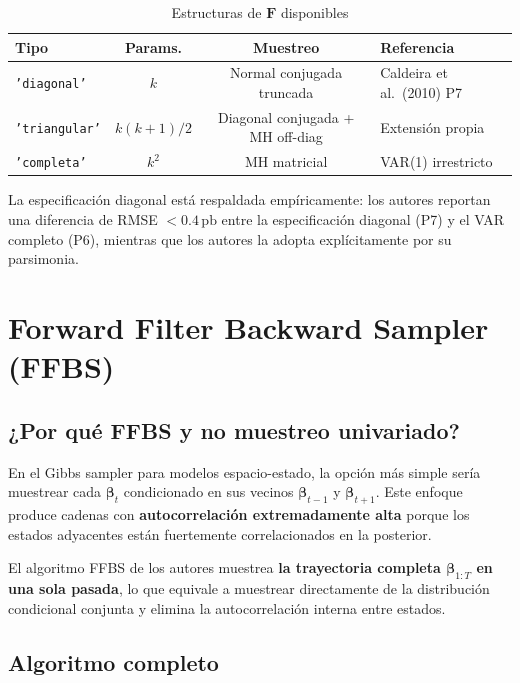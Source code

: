 \documentclass[12pt, a4paper]{article}
\theoremstyle{plain}
\theoremstyle{definition}
\theoremstyle{remark}
\newcommand{\bbet}{\bm{\beta}}
\newcommand{\bF}{\mathbf{F}}
\begin{document}
\begin{table}[H]
\centering
\caption{Estructuras de $\bF$ disponibles}
\small
\begin{tabular}{lccl}
\toprule
\textbf{Tipo} & \textbf{Params.} & \textbf{Muestreo} & \textbf{Referencia} \\
\midrule
\texttt{'diagonal'} & $k$ & Normal conjugada truncada & Caldeira et al.\ (2010) P7 \\
\texttt{'triangular'} & $k(k+1)/2$ & Diagonal conjugada + MH off-diag & Extensión propia \\
\texttt{'completa'} & $k^2$ & MH matricial & VAR(1) irrestricto \\
\bottomrule
\end{tabular}
\end{table}

La especificación diagonal está respaldada empíricamente: los autores
reportan una diferencia de RMSE $< 0.4\,\text{pb}$ entre la especificación
diagonal (P7) y el VAR completo (P6), mientras que los autores
la adopta explícitamente por su parsimonia.

\section{Forward Filter Backward Sampler (FFBS)}

\subsection{¿Por qué FFBS y no muestreo univariado?}

En el Gibbs sampler para modelos espacio-estado, la opción más simple
sería muestrear cada $\bbet_t$ condicionado en sus vecinos $\bbet_{t-1}$
y $\bbet_{t+1}$. Este enfoque produce cadenas con \textbf{autocorrelación
extremadamente alta} porque los estados adyacentes están fuertemente
correlacionados en la posterior.

El algoritmo FFBS de los autores muestrea \textbf{la trayectoria
completa $\bbet_{1:T}$ en una sola pasada}, lo que equivale a muestrear
directamente de la distribución condicional conjunta y elimina la
autocorrelación interna entre estados.

\subsection{Algoritmo completo}
\end{document}
